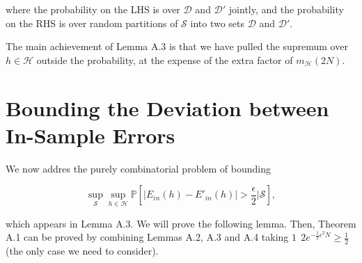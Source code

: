 where the probability on the LHS is over $\mathcal{D}$ and $\mathcal{D}'$ jointly, and the probability on the RHS is over random partitions of $\mathcal{S}$ into two sets $\mathcal{D}$ and $\mathcal{D}'$.

    The main achievement of Lemma A.3 is that we have pulled the supremum over $h \in \mathcal{H}$ outside the probability, at the expense of the extra factor of $m_{\mathcal{H}}(2N)$.

\section{Bounding the Deviation between In-Sample Errors}

We now addres the purely combinatorial problem of bounding

\begin{displaymath}
    \sup_{\mathcal{S}} \sup_{h \in \mathcal{H}} \mathbb{P} \left[| E_{in}(h) - E'_{in}(h) | > \frac{\epsilon}{2} \Big\vert \mathcal{S} \right],
\end{displaymath}

which appears in Lemma A.3. We will prove the following lemma. Then, Theorem A.1 can be proved by combining Lemmas A.2, A.3 and A.4 taking $1 \ \ 2e^{- \frac{1}{2} \epsilon^2 N} \geq \frac{1}{2}$ (the only case we need to consider).

